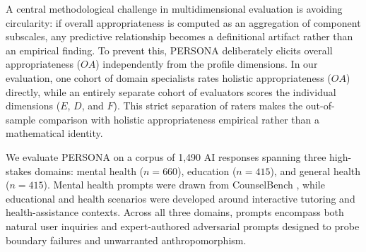 \documentclass[manuscript,review,anonymous]{acmart}
\begin{document}

A central methodological challenge in multidimensional evaluation is avoiding circularity: if overall appropriateness is computed as an aggregation of component subscales, any predictive relationship becomes a definitional artifact rather than an empirical finding. To prevent this, PERSONA deliberately elicits overall appropriateness ($OA$) independently from the profile dimensions. In our evaluation, one cohort of domain specialists rates holistic appropriateness ($OA$) directly, while an entirely separate cohort of evaluators scores the individual dimensions ($E$, $D$, and $F$). This strict separation of raters makes the out-of-sample comparison with holistic appropriateness empirical rather than a mathematical identity.


We evaluate PERSONA on a corpus of 1,490 AI responses spanning three high-stakes domains: mental health ($n=660$), education ($n=415$), and general health ($n=415$). Mental health prompts were drawn from CounselBench \cite{CounselBench2025}, while educational and health scenarios were developed around interactive tutoring and health-assistance contexts. Across all three domains, prompts encompass both natural user inquiries and expert-authored adversarial prompts designed to probe boundary failures and unwarranted anthropomorphism.
\end{document}
